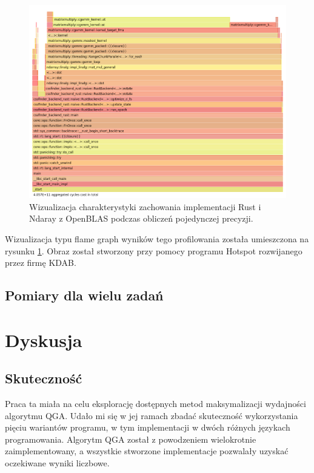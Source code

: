 \documentclass[11pt, a4paper]{article}
\begin{document}
\begin{sloppypar}
    \FloatBarrier
    \begin{figure}[ht]
      \centering
      \includegraphics[width=1.0\textwidth]{"resources/rust_flame_graph_perf.png"}
      \caption{Wizualizacja charakterystyki zachowania implementacji Rust i Ndaray z OpenBLAS podczas obliczeń pojedynczej precyzji.}
      \label{rust-flame-graph-prof}
    \end{figure}
    \FloatBarrier

    Wizualizacja typu flame graph wyników tego profilowania została umieszczona na
    rysunku \ref{rust-flame-graph-prof}. Obraz został stworzony przy pomocy programu Hotspot\cite{HOTSPOT}
    rozwijanego przez firmę KDAB.

    \subsection{Pomiary dla wielu zadań}


    \section{Dyskusja}


    \subsection{Skuteczność}


    Praca ta miała na celu eksplorację dostępnych metod maksymalizacji wydajności
    algorytmu QGA. Udało mi się w jej ramach zbadać skuteczność wykorzystania pięciu wariantów
    programu, w tym implementacji w dwóch różnych językach programowania. Algorytm QGA został
    z powodzeniem wielokrotnie zaimplementowany, a wszystkie stworzone implementacje
    pozwalały uzyskać oczekiwane wyniki liczbowe.


\end{sloppypar}
\end{document}
